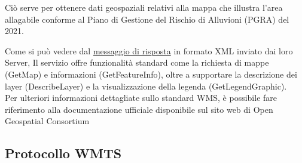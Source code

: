 Ciò serve per ottenere dati geospaziali relativi alla mappa che illustra l'area allagabile conforme al Piano di Gestione del Rischio di Alluvioni (PGRA) del 2021.

Come si può vedere dal \href{http://wms.pcn.minambiente.it/ogc?map=/ms_ogc/WMS_v1.3/Vettoriali/Alluvioni_Estensione.map&service=wms&request=getCapabilities}{messaggio di risposta} in formato XML inviato dai loro Server,
Il servizio offre funzionalità standard come la richiesta di mappe (GetMap) e informazioni (GetFeatureInfo), oltre a supportare la descrizione dei layer (DescribeLayer) e la visualizzazione della legenda (GetLegendGraphic).
\\Per ulteriori informazioni dettagliate sullo standard WMS, è possibile fare riferimento alla documentazione ufficiale disponibile sul sito web di Open Geospatial Consortium \cite{DocumentazioneWMTS}

\subsection{Protocollo WMTS}

